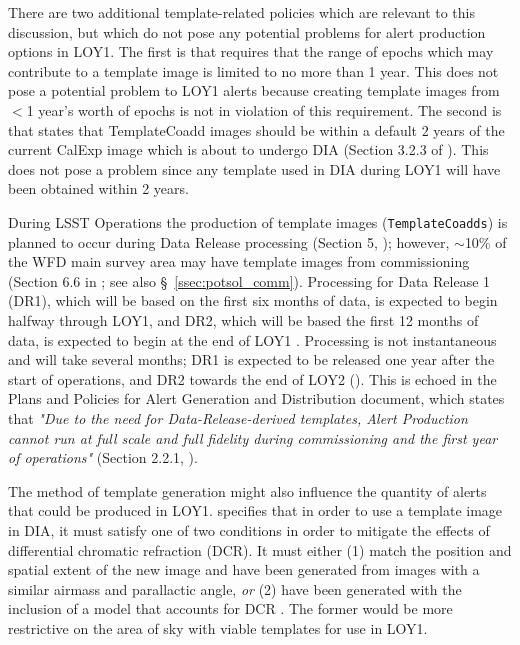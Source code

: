 \documentclass[DM,lsstdraft,toc]{lsstdoc}
\begin{document}

There are two additional template-related policies which are relevant to this discussion, but which do not pose any potential problems for alert production options in LOY1.
The first is that  requires that the range of epochs which may contribute to a template image is limited to no more than 1 year.
This does not pose a potential problem to LOY1 alerts because creating template images from $<$1 year's worth of epochs is not in violation of this requirement.
The second is that  states that TemplateCoadd images should be within a default $2$ years of the current CalExp image which is about to undergo DIA (Section 3.2.3 of \cite{LDM-151}).
This does not pose a problem since any template used in DIA during LOY1 will have been obtained within 2 years.

During LSST Operations the production of template images ({\tt TemplateCoadds}) is planned to occur during Data Release processing (Section 5, ); however, $\sim$10\% of the WFD main survey area may have template images from commissioning (Section 6.6 in ; see also \S~\ref{ssec:potsol_comm}).
Processing for Data Release 1 (DR1), which will be based on the first six months of data, is expected to begin halfway through LOY1, and DR2, which will be based the first 12 months of data, is expected to begin at the end of LOY1 .
Processing is not instantaneous and will take several months; DR1 is expected to be released one year after the start of operations, and DR2 towards the end of LOY2 (). 
This is echoed in the Plans and Policies for Alert Generation and Distribution document, which states that {\it "Due to the need for Data-Release-derived templates, Alert Production cannot run at full scale and full fidelity during commissioning and the first year of operations"} (Section 2.2.1, ). 

The method of template generation might also influence the quantity of alerts that could be produced in LOY1.
 specifies that in order to use a template image in DIA, it must satisfy one of two conditions in order to mitigate the effects of differential chromatic refraction (DCR).
It must either (1) match the position and spatial extent of the new image and have been generated from images with a similar airmass and parallactic angle, {\em or} (2) have been generated with the inclusion of a model that accounts for DCR .
The former would be more restrictive on the area of sky with viable templates for use in LOY1.
\end{document}
